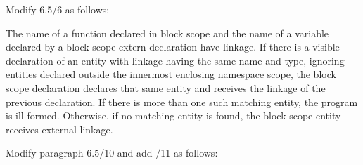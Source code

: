 Modify 6.5/6 as follows:
\begin{std.txt}
\pnum[6]
The name of a function declared in block scope and the name of a
variable declared by a block scope extern declaration have linkage.
If there is a visible declaration of an entity with linkage having the
same name and type, ignoring entities declared outside the innermost
enclosing namespace scope, the block scope declaration declares that
same entity and receives the linkage of the previous declaration. 
If
there is more than one such matching entity, the program is
ill-formed. Otherwise, if no matching entity is found, the block scope
entity receives external linkage.
\end{std.txt}

Modify paragraph 6.5/10 and add /11 as follows:
